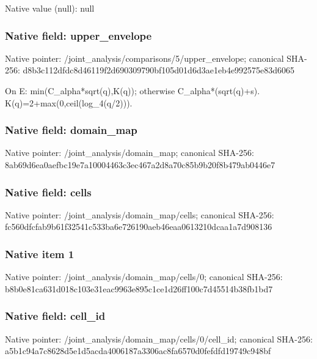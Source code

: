 \documentclass[10pt,a4paper]{article}
\begin{document}
Native value (null): null



\subsubsection{Native field: upper\_envelope}


Native pointer: /joint\_analysis/comparis\allowbreak{}ons/5/upper\_envelope; canonical SHA-256: d8b3c112dfdc8d46119f2d69\allowbreak{}0309790bf105d01d6d3ae1eb\allowbreak{}4e992575e83d6065


On E: min(C\_alpha*sqrt(q),K(q)); otherwise C\_alpha*(sqrt(q)+s). K(q)=2+max(0,ceil(log\_4(q/2))).


\subsubsection{Native field: domain\_map}


Native pointer: /joint\_analysis/domain\_map; canonical SHA-256: 8ab69d6ea0aefbc19e7a1000\allowbreak{}4463c3ec467a2d8a70c85b9b\allowbreak{}20f8b479ab0446e7



\subsubsection{Native field: cells}


Native pointer: /joint\_analysis/domain\_map/cells; canonical SHA-256: fc560dfcfab9b61f32541c53\allowbreak{}3ba6e726190aeb46eaa06132\allowbreak{}10dcaa1a7d908136



\subsubsection{Native item 1}


Native pointer: /joint\_analysis/domain\_map/cells/0; canonical SHA-256: b8b0e81ca631d018c103e31e\allowbreak{}ac9963e895c1ce1d26ff100c\allowbreak{}7d45514b38fb1bd7



\subsubsection{Native field: cell\_id}


Native pointer: /joint\_analysis/domain\_m\allowbreak{}ap/cells/0/cell\_id; canonical SHA-256: a5b1c94a7c8628d5e1d5acda\allowbreak{}4006187a3306ac8fa6570d0f\allowbreak{}efdfd19749c948bf
\end{document}
